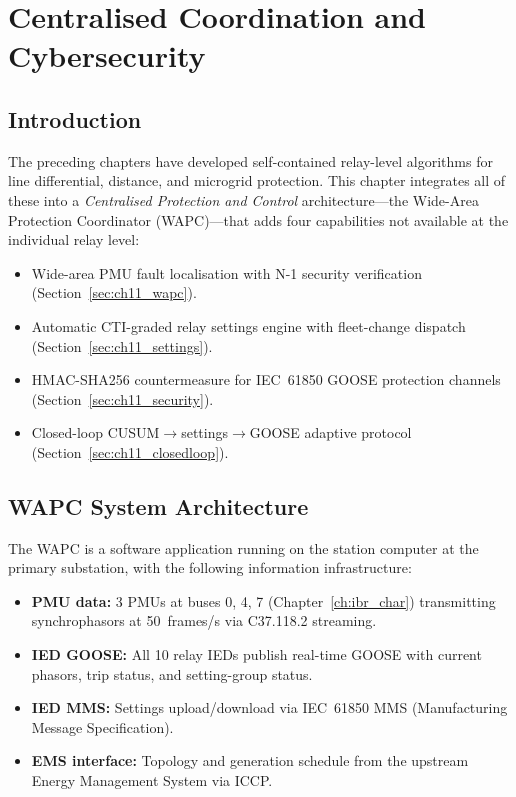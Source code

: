 \chapter{Centralised Coordination and Cybersecurity}
\label{ch:coordination_security}
\label{ch:centralised}
\label{ch:cybersecurity}

\section{Introduction}
\label{sec:ch11_intro}

The preceding chapters have developed self-contained relay-level algorithms
for line differential, distance, and microgrid protection. This chapter
integrates all of these into a \emph{Centralised Protection and Control}
architecture—the Wide-Area Protection Coordinator (WAPC)—that adds
four capabilities not available at the individual relay level:
\begin{itemize}
\item Wide-area PMU fault localisation with N-1 security
      verification (Section~\ref{sec:ch11_wapc}).
\item Automatic CTI-graded relay settings engine with
      fleet-change dispatch (Section~\ref{sec:ch11_settings}).
\item HMAC-SHA256 countermeasure for IEC~61850 GOOSE
      protection channels (Section~\ref{sec:ch11_security}).
\item Closed-loop CUSUM$\to$settings$\to$GOOSE adaptive
      protocol (Section~\ref{sec:ch11_closedloop}).
\end{itemize}

\section{WAPC System Architecture}
\label{sec:ch11_wapc_arch}

The WAPC is a software application running on the station computer
at the primary substation, with the following information infrastructure:
\begin{itemize}
\item \textbf{PMU data:} 3 PMUs at buses 0, 4, 7 (Chapter~\ref{ch:ibr_char})
      transmitting synchrophasors at 50~frames/s via C37.118.2 streaming.
\item \textbf{IED GOOSE:} All 10 relay IEDs publish real-time GOOSE
      with current phasors, trip status, and setting-group status.
\item \textbf{IED MMS:} Settings upload/download via IEC~61850 MMS
      (Manufacturing Message Specification).
\item \textbf{EMS interface:} Topology and generation schedule from the
      upstream Energy Management System via ICCP.
\end{itemize}

